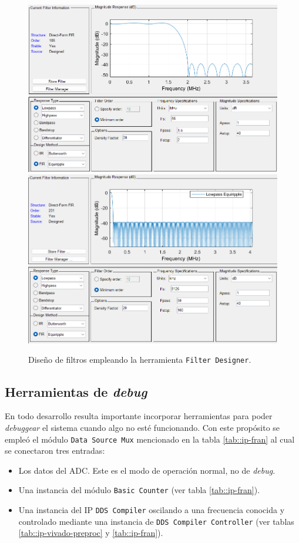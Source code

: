 \documentclass[../../main.tex]{subfiles}
\begin{document}
\begin{figure}[H]
    \centering
    {\includegraphics[width=0.7\linewidth]{band-filter.png}}
    \\[1PC]
    {\includegraphics[width=0.7\linewidth]{beam-filter-old.png}}
    \caption{Diseño de filtros empleando la herramienta \texttt{Filter Designer}.}
    \label{fig::filter-designs-old}
\end{figure}
\subsection{Herramientas de \textit{debug}}\label{subsec::debug-preproc-inicial}
En todo desarrollo resulta importante incorporar herramientas para poder \textit{debuggear} el sistema cuando algo no esté funcionando. Con este propósito se empleó el módulo \texttt{Data Source Mux} mencionado en la tabla \ref{tab::ip-fran} al cual se conectaron tres entradas:
\begin{itemize}
    \item Los datos del ADC. Este es el modo de operación normal, no de \textit{debug}.
    \item Una instancia del módulo \texttt{Basic Counter} (ver tabla \ref{tab::ip-fran}).
    \item Una instancia del IP \texttt{DDS Compiler} oscilando a una frecuencia conocida y controlado mediante una instancia de \texttt{DDS Compiler Controller} (ver tablas \ref{tab::ip-vivado-preproc} y \ref{tab::ip-fran}).
\end{itemize}
\end{document}
